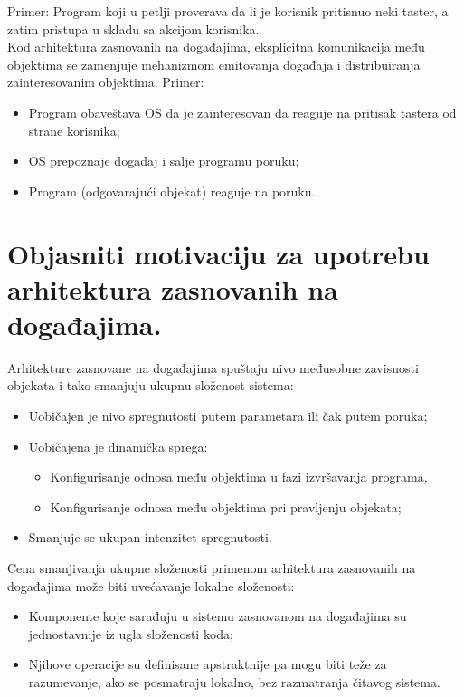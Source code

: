 \documentclass[a4paper]{article}
\begin{document}
  \noindent Primer: Program koji u petlji proverava da li je korisnik pritisnuo neki taster, a zatim pristupa 
  u skladu sa akcijom korisnika.\\
  
  \indent Kod arhitektura zasnovanih na događajima, eksplicitna komunikacija među 
  objektima se zamenjuje mehanizmom emitovanja događaja i distribuiranja zainteresovanim objektima.
  Primer:
  \begin{itemize}
    \item Program obaveštava OS da je zainteresovan da reaguje na pritisak tastera od strane korisnika;
    \item OS prepoznaje dogadaj i salje programu poruku;
    \item Program (odgovarajući objekat) reaguje na poruku.
  \end{itemize}

\section{Objasniti motivaciju za upotrebu arhitektura zasnovanih na događajima.}
  Arhitekture zasnovane na događajima spuštaju nivo međusobne zavisnosti objekata i tako smanjuju 
  ukupnu složenost sistema:
  \begin{itemize}
    \item Uobičajen je nivo spregnutosti putem parametara ili čak putem poruka;
    \item Uobičajena je dinamička sprega:
          \begin{itemize}
            \item Konfigurisanje odnosa među objektima u fazi izvršavanja programa,
            \item Konfigurisanje odnosa među objektima pri pravljenju objekata;
          \end{itemize}
    \item Smanjuje se ukupan intenzitet spregnutosti.
  \end{itemize}
  Cena smanjivanja ukupne složenosti primenom arhitektura zasnovanih na događajima može 
  biti uvećavanje lokalne složenosti:
  \begin{itemize}
    \item Komponente koje sarađuju u sistemu zasnovanom na događajima su 
          jednostavnije iz ugla složenosti koda;
    \item Njihove operacije su definisane apstraktnije pa mogu biti teže za razumevanje, 
          ako se posmatraju lokalno, bez razmatranja čitavog sistema.
  \end{itemize}
  
\end{document}
